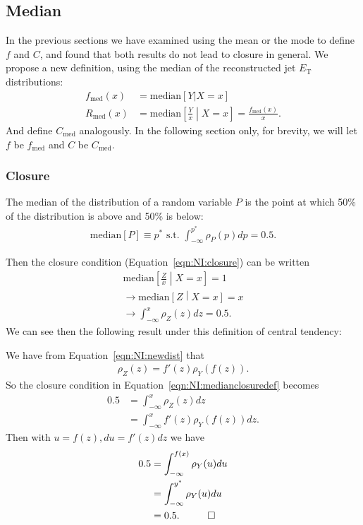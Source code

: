 \subsection{Median}
\label{sec:NI:median}
In the previous sections we have examined using the mean or the mode to define $f$ and $C$, and found that both results do not lead to closure in general. We propose a new definition, using the median of the reconstructed jet $E_\text{T}$ distributions:
\begin{align}
f_\text{med}(x)&=\text{median}[Y|X=x]\\
R_\text{med}(x) &= \text{median}\left[\frac{Y}{x}\middle| X=x\right] = \frac{f_\text{med}(x)}{x}. 
\end{align}
And define $C_\text{med}$ analogously.  In the following section only, for brevity, we will let $f$ be $f_\text{med}$ and $C$ be $C_\text{med}$.

\subsubsection{Closure}
\label{sec:NI:medianclosuresection}
The median of the distribution of a random variable $P$ is the point at which 50\% of the distribution is above and 50\% is below:
\begin{align}
  \text{median}[P] \equiv p^* \text{ s.t. } \int_{-\infty}^{p^*} \rho_P(p) dp = 0.5.
\end{align}

Then the closure condition (Equation~\ref{eqn:NI:closure}) can be written
\begin{align}
\text{median}\left[\frac{Z}{x}\middle| X=x\right] = 1\nonumber\\
\rightarrow \text{median}\left[Z\middle| X=x\right] = x\nonumber\\
\rightarrow \int_{-\infty}^{x} \rho_Z(z) dz = 0.5.
\label{eqn:NI:medianclosuredef}
\end{align}
We can see then the following result under this definition of central tendency:

\vspace{5mm}


\vspace{5mm}

 We have from Equation~\ref{eqn:NI:newdist} that
\begin{align}
\rho_Z(z) = f'(z)\rho_Y(f(z)).
\end{align}
So the closure condition in Equation~\ref{eqn:NI:medianclosuredef} becomes
\begin{align}
0.5 &= \int_{-\infty}^{x} \rho_Z(z) dz\nonumber\\
&=\int_{-\infty}^{x} f'(z)\rho_Y(f(z)) dz.
\end{align}
Then with $u = f(z), du = f'(z) dz$ we have
\begin{align}
0.5 &= \int_{-\infty}^{f(x)} \rho_Y(u) du\nonumber\\
&=\int_{-\infty}^{y^*} \rho_Y(u) du\nonumber\\
&=0.5. \hspace{1 cm} \Box
\end{align}


